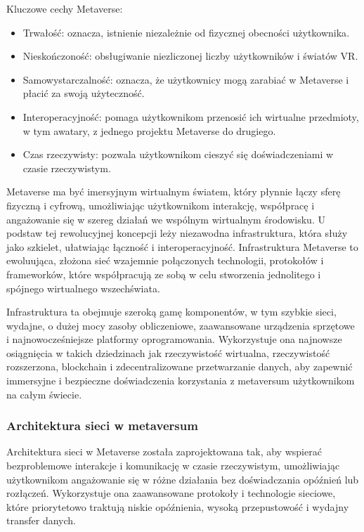 Kluczowe cechy Metaverse:

\begin{itemize}
    \item Trwałość:  oznacza, istnienie niezależnie od fizycznej obecności użytkownika\cite{metaverseAFullDive}.
    \item Nieskończoność: obsługiwanie niezliczonej liczby użytkowników i światów VR\cite{metaverseAFullDive}.
    \item Samowystarczalność: oznacza, że użytkownicy mogą zarabiać w Metaverse i płacić za swoją użyteczność\cite{metaverseAFullDive}.
    \item Interoperacyjność: pomaga użytkownikom przenosić ich wirtualne przedmioty, w tym awatary, z jednego projektu Metaverse do drugiego\cite{metaverseAFullDive}.
    \item Czas rzeczywisty: pozwala użytkownikom cieszyć się doświadczeniami w czasie rzeczywistym\cite{metaverseAFullDive}.
\end{itemize}


Metaverse ma być imersyjnym wirtualnym światem, który płynnie łączy sferę fizyczną i cyfrową, umożliwiając użytkownikom interakcję, współpracę i angażowanie się w szereg działań we wspólnym wirtualnym środowisku. U podstaw tej rewolucyjnej koncepcji leży niezawodna infrastruktura, która służy jako szkielet, ułatwiając łączność i interoperacyjność. Infrastruktura Metaverse to ewoluująca, złożona sieć wzajemnie połączonych technologii, protokołów i frameworków, które współpracują ze sobą w celu stworzenia jednolitego i spójnego wirtualnego wszechświata\cite{metaverseInfrastructureIEEE}.

Infrastruktura ta obejmuje szeroką gamę komponentów, w tym szybkie sieci, wydajne, o dużej mocy zasoby obliczeniowe, zaawansowane urządzenia sprzętowe i najnowocześniejsze platformy oprogramowania. Wykorzystuje ona najnowsze osiągnięcia w takich dziedzinach jak rzeczywistość wirtualna, rzeczywistość rozszerzona, blockchain i zdecentralizowane przetwarzanie danych, aby zapewnić immersyjne i bezpieczne doświadczenia korzystania z metaversum użytkownikom na całym świecie\cite{metaverseInfrastructureIEEE}.

\subsubsection{Architektura sieci w metaversum}

Architektura sieci w Metaverse została zaprojektowana tak, aby wspierać bezproblemowe interakcje i komunikację w czasie rzeczywistym, umożliwiając użytkownikom angażowanie się w różne działania bez doświadczania opóźnień lub rozłączeń. Wykorzystuje ona zaawansowane protokoły i technologie sieciowe, które priorytetowo traktują niskie opóźnienia, wysoką przepustowość i wydajny transfer danych\cite{metaverseInfrastructureIEEE}.

